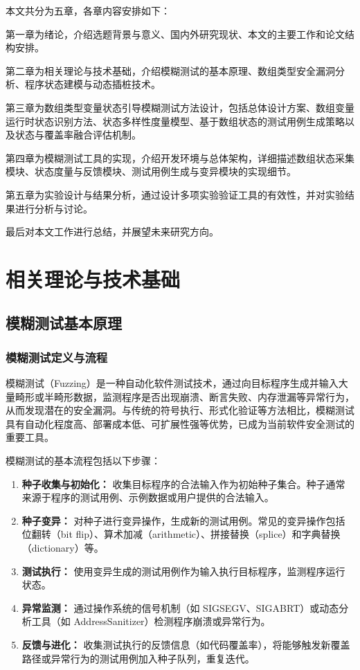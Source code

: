 \documentclass[bachelor]{njupthesis}
\begin{document}
本文共分为五章，各章内容安排如下：

第一章为绪论，介绍选题背景与意义、国内外研究现状、本文的主要工作和论文结构安排。

第二章为相关理论与技术基础，介绍模糊测试的基本原理、数组类型安全漏洞分析、程序状态建模与动态插桩技术。

第三章为数组类型变量状态引导模糊测试方法设计，包括总体设计方案、数组变量运行时状态识别方法、状态多样性度量模型、基于数组状态的测试用例生成策略以及状态与覆盖率融合评估机制。

第四章为模糊测试工具的实现，介绍开发环境与总体架构，详细描述数组状态采集模块、状态度量与反馈模块、测试用例生成与变异模块的实现细节。

第五章为实验设计与结果分析，通过设计多项实验验证工具的有效性，并对实验结果进行分析与讨论。

最后对本文工作进行总结，并展望未来研究方向。

\chapter{相关理论与技术基础}

\section{模糊测试基本原理}

\subsection{模糊测试定义与流程}

模糊测试（Fuzzing）是一种自动化软件测试技术，通过向目标程序生成并输入大量畸形或半畸形数据，监测程序是否出现崩溃、断言失败、内存泄漏等异常行为，从而发现潜在的安全漏洞\cite{AFLPLUSPLUS}。与传统的符号执行、形式化验证等方法相比，模糊测试具有自动化程度高、部署成本低、可扩展性强等优势，已成为当前软件安全测试的重要工具。

模糊测试的基本流程包括以下步骤：

\begin{enumerate}
    \item \textbf{种子收集与初始化：} 收集目标程序的合法输入作为初始种子集合。种子通常来源于程序的测试用例、示例数据或用户提供的合法输入。
    \item \textbf{种子变异：} 对种子进行变异操作，生成新的测试用例。常见的变异操作包括位翻转（bit flip）、算术加减（arithmetic）、拼接替换（splice）和字典替换（dictionary）等。
    \item \textbf{测试执行：} 使用变异生成的测试用例作为输入执行目标程序，监测程序运行状态。
    \item \textbf{异常监测：} 通过操作系统的信号机制（如 SIGSEGV、SIGABRT）或动态分析工具（如 AddressSanitizer\cite{sanitizer}）检测程序崩溃或异常行为。
    \item \textbf{反馈与进化：} 收集测试执行的反馈信息（如代码覆盖率），将能够触发新覆盖路径或异常行为的测试用例加入种子队列，重复迭代。
\end{enumerate}
\end{document}
